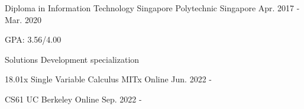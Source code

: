 

\begin{cventries}

  \cventry
    {Diploma in Information Technology} %
    {Singapore Polytechnic} %
    {Singapore} %
    {Apr. 2017 - Mar. 2020} %
    {
      \begin{cvitems} %
        \item {GPA: 3.56/4.00}
        \item {Solutions Development specialization}
      \end{cvitems}
    }

    \cventry
    {18.01x Single Variable Calculus} %
    {MITx} %
    {Online} %
    {Jun. 2022 - } %

    \cventry
    {CS61} %
    {UC Berkeley} %
    {Online} %
    {Sep. 2022 - } %


\end{cventries}
